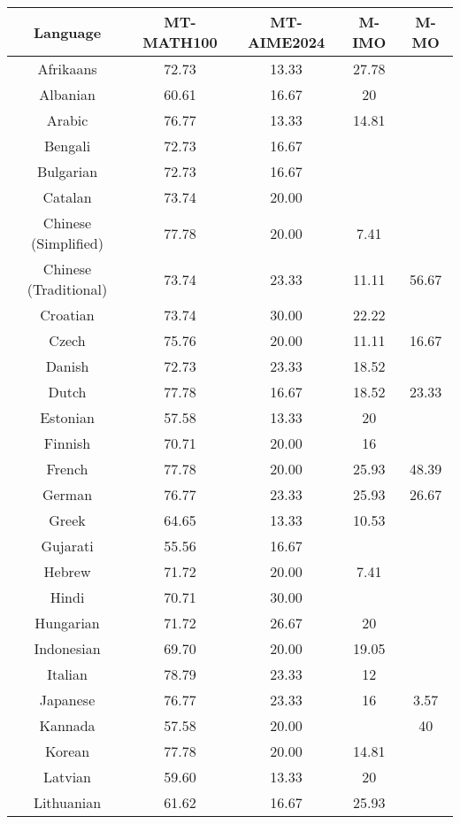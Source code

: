 \begin{table*}[]
\centering
\fontsize{9}{11} \selectfont
\begin{tabular}{c|cccc}
\toprule
\textbf{Language} & \textbf{MT-MATH100} & \textbf{MT-AIME2024} & \textbf{M-IMO} & \textbf{M-MO} \\ \midrule
Afrikaans & 72.73 & 13.33 & 27.78 &  \\
Albanian & 60.61 & 16.67 & 20 &  \\
Arabic & 76.77 & 13.33 & 14.81 &  \\
Bengali & 72.73 & 16.67 & \multicolumn{1}{l}{} &  \\
Bulgarian & 72.73 & 16.67 & \multicolumn{1}{l}{} &  \\
Catalan & 73.74 & 20.00 & \multicolumn{1}{l}{} &  \\
Chinese (Simplified) & 77.78 & 20.00 & 7.41 &  \\
Chinese (Traditional) & 73.74 & 23.33 & 11.11 & \multirow{-2}{*}{56.67} \\
Croatian & 73.74 & 30.00 & 22.22 &  \\
Czech & 75.76 & 20.00 & 11.11 & 16.67 \\
Danish & 72.73 & 23.33 & 18.52 &  \\
Dutch & 77.78 & 16.67 & 18.52 & 23.33 \\
Estonian & 57.58 & 13.33 & 20 &  \\
Finnish & 70.71 & 20.00 & 16 &  \\
French & 77.78 & 20.00 & 25.93 & 48.39 \\
German & 76.77 & 23.33 & 25.93 & 26.67 \\
Greek & 64.65 & 13.33 & 10.53 &  \\
Gujarati & 55.56 & 16.67 & \multicolumn{1}{l}{} &  \\
Hebrew & 71.72 & 20.00 & 7.41 &  \\
Hindi & 70.71 & 30.00 & \multicolumn{1}{l}{} &  \\
Hungarian & 71.72 & 26.67 & 20 &  \\
Indonesian & 69.70 & 20.00 & 19.05 &  \\
Italian & 78.79 & 23.33 & 12 &  \\
Japanese & 76.77 & 23.33 & 16 & 3.57 \\
Kannada & 57.58 & 20.00 & \multicolumn{1}{l}{} & 40 \\
Korean & 77.78 & 20.00 & 14.81 &  \\
Latvian & 59.60 & 13.33 & 20 &  \\
Lithuanian & 61.62 & 16.67 & 25.93 &  \\

\end{tabular}
\end{table*}
